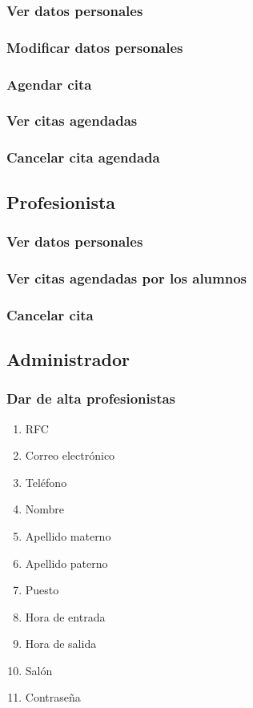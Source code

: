 \documentclass[11pt]{article}
\begin{document}
\subsubsection{Ver datos personales}
\label{sec-2-1-2}
\subsubsection{Modificar datos personales}
\label{sec-2-1-3}
\subsubsection{Agendar cita}
\label{sec-2-1-4}
\subsubsection{Ver citas agendadas}
\label{sec-2-1-5}
\subsubsection{Cancelar cita agendada}
\label{sec-2-1-6}
\subsection{Profesionista}
\label{sec-2-2}
\subsubsection{Ver datos personales}
\label{sec-2-2-1}
\subsubsection{Ver citas agendadas por los alumnos}
\label{sec-2-2-2}
\subsubsection{Cancelar cita}
\label{sec-2-2-3}
\subsection{Administrador}
\label{sec-2-3}
\subsubsection{Dar de alta profesionistas}
\label{sec-2-3-1}
\begin{enumerate}
\item RFC
\label{sec-2-3-1-1}
\item Correo electrónico
\label{sec-2-3-1-2}
\item Teléfono
\label{sec-2-3-1-3}
\item Nombre
\label{sec-2-3-1-4}
\item Apellido materno
\label{sec-2-3-1-5}
\item Apellido paterno
\label{sec-2-3-1-6}
\item Puesto
\label{sec-2-3-1-7}
\item Hora de entrada
\label{sec-2-3-1-8}
\item Hora de salida
\label{sec-2-3-1-9}
\item Salón
\label{sec-2-3-1-10}
\item Contraseña
\label{sec-2-3-1-11}
\end{enumerate}
\end{document}
